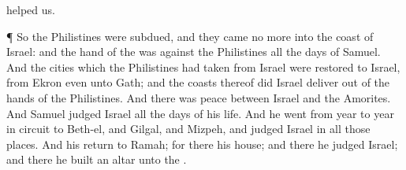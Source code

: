 {{}
helped us.
\par }{\PP {}¶ So the
Philistines were
subdued, and they
came no
more into the
coast of
Israel: and the
hand of the
{} was against the
Philistines all the
days of
Samuel.
And the
cities which the
Philistines had
taken from
Israel were
restored to
Israel, from
Ekron even unto
Gath; and the
coasts thereof did
Israel
deliver out of the
hands of the
Philistines. And there was
peace between
Israel and the
Amorites.
And
Samuel
judged
Israel all the
days of his
life.
And he
went
from
year to
year in
circuit to
Beth-el, and
Gilgal, and
Mizpeh, and
judged
Israel in all those
places.
And his
return
{} to
Ramah; for there
{} his
house; and there he
judged
Israel; and there he
built an
altar unto the
{}.

}
